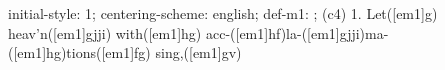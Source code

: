 initial-style: 1;
centering-scheme: english;
def-m1: \grealign;
(c4) 1. Let([em1]g) heav'n([em1]gjji) with([em1]hg) acc-([em1]hf)la-([em1]gjji)ma-([em1]hg)tions([em1]fg) sing,([em1]gv)